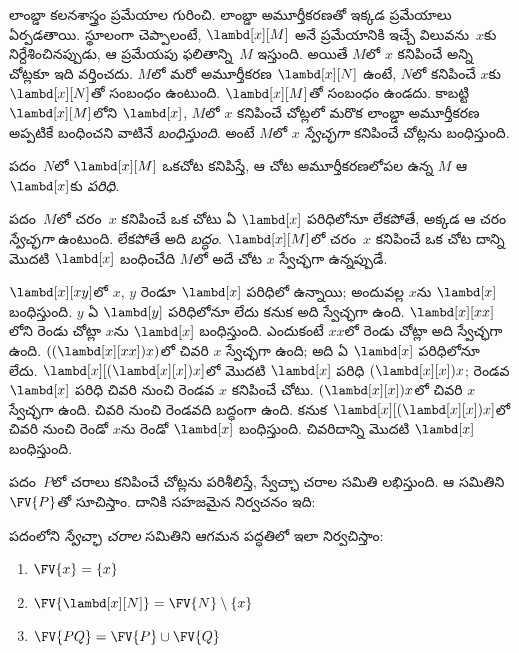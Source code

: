 \documentclass[../../../include/open-logic-section]{subfiles}
\begin{document}

లాంబ్డా కలనశాస్త్రం ప్రమేయాల గురించి. లాంబ్డా అమూర్తీకరణతో ఇక్కడ
ప్రమేయాలు ఏర్పడతాయి. స్థూలంగా చెప్పాలంటే, $\lambd[x][M]$ అనే ప్రమేయానికి
ఇచ్చే విలువను~$x$కు నిర్దేశించినప్పుడు, ఆ ప్రమేయపు ఫలితాన్ని~$M$
ఇస్తుంది. అయితే $M$లో $x$ కనిపించే అన్ని చోట్లకూ ఇది వర్తించదు.
$M$లో మరో అమూర్తీకరణ $\lambd[x][N]$ ఉంటే, $N$లో కనిపించే $x$కు
$\lambd[x][N]$తో సంబంధం ఉంటుంది. $\lambd[x][M]$తో సంబంధం ఉండదు.
కాబట్టి $\lambd[x][M]$లోని $\lambd[x]$, $M$లో $x$ కనిపించే చోట్లలో
మరొక లాంబ్డా అమూర్తీకరణ అప్పటికే బంధించని వాటినే \emph{బంధిస్తుంది}.
అంటే $M$లో $x$ \emph{స్వేచ్ఛగా} కనిపించే చోట్లను బంధిస్తుంది.

\begin{defn}[పరిధి]
పదం~$N$లో $\lambd[x][M]$ ఒకచోట కనిపిస్తే, ఆ చోట అమూర్తీకరణలోపల
ఉన్న $M$ ఆ $\lambd[x]$కు \emph{పరిధి}.
\end{defn}


\begin{defn}[చరం స్వేచ్ఛగా లేదా బద్ధంగా కనిపించే చోటు]
  పదం~$M$లో చరం~$x$ కనిపించే ఒక చోటు ఏ $\lambd[x]$ పరిధిలోనూ
  లేకపోతే, అక్కడ ఆ చరం \emph{స్వేచ్ఛగా} ఉంటుంది. లేకపోతే అది \emph{బద్ధం}.
  $\lambd[x][M]$లో చరం~$x$ కనిపించే ఒక చోట దాన్ని మొదటి $\lambd[x]$
  బంధించేది $M$లో అదే చోట $x$ స్వేచ్ఛగా ఉన్నప్పుడే.
\end{defn}

\begin{ex}
  $\lambd[x][x y]$లో $x$, $y$ రెండూ $\lambd[x]$ పరిధిలో ఉన్నాయి;
  అందువల్ల $x$ను $\lambd[x]$ బంధిస్తుంది. $y$ ఏ $\lambd[y]$
  పరిధిలోనూ లేదు కనుక అది స్వేచ్ఛగా ఉంది. $\lambd[x][x x]$లోని
  రెండు చోట్లా $x$ను $\lambd[x]$ బంధిస్తుంది. ఎందుకంటే $xx$లో
  రెండు చోట్లా అది స్వేచ్ఛగా ఉంది. $((\lambd[x][xx])x)$లో చివరి $x$
  స్వేచ్ఛగా ఉంది; అది ఏ $\lambd[x]$ పరిధిలోనూ లేదు.
  $\lambd[x][(\lambd[x][x])x]$లో మొదటి $\lambd[x]$ పరిధి
  $(\lambd[x][x])x$; రెండవ $\lambd[x]$ పరిధి చివరి నుంచి రెండవ
  $x$ కనిపించే చోటు. $(\lambd[x][x])x$లో చివరి $x$ స్వేచ్ఛగా ఉంది.
  చివరి నుంచి రెండవది బద్ధంగా ఉంది. కనుక
  $\lambd[x][(\lambd[x][x])x]$లో చివరి నుంచి రెండో $x$ను
  రెండో $\lambd[x]$ బంధిస్తుంది. చివరిదాన్ని మొదటి $\lambd[x]$
  బంధిస్తుంది.
\end{ex}

పదం~$P$లో చరాలు కనిపించే చోట్లను పరిశీలిస్తే, స్వేచ్ఛా చరాల సమితి
లభిస్తుంది. ఆ సమితిని $\FV{P}$తో సూచిస్తాం. దానికి సహజమైన
నిర్వచనం ఇది:

\begin{defn}[పదంలోని స్వేచ్ఛా చరాలు] 
  పదంలోని \emph{స్వేచ్ఛా చరాల} సమితిని ఆగమన పద్ధతిలో ఇలా
  నిర్వచిస్తాం:
  \begin{enumerate}
    \item $\FV{x} = \{x\}$ 
    \item $\FV{\lambd[x][N]} = \FV{N} \setminus \{x\}$ 
    \item $\FV{PQ} = \FV{P} \cup \FV{Q}$ 
  \end{enumerate}
\end{defn}
\end{document}
